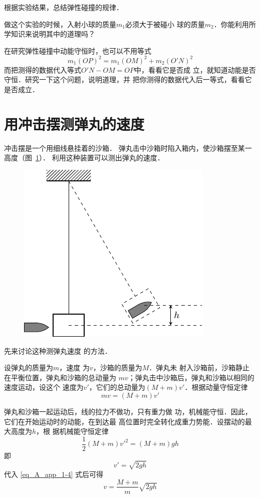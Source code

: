 根据实验结果，总结弹性碰撞的规律．

做这个实验的时候，入射小球的质量$m_1$必须大于被碰小
球的质量$m_2$．你能利用所学知识来说明其中的道理吗？

在研究弹性碰撞中动能守恒时，也可以不用等式
\[m_1(OP)^2=m_1(OM)^2+m_2(O'N)^2\]
而把测得的数据代入等式$O'N-OM=OP$中，看看它是否成
立，就知道动能是否守恒．研究一下这个问题，说明道理，并
把你测得的数据代入后一等式，看看它是否成立．


\section{用冲击摆测弹丸的速度}
冲击摆是一个用细线悬挂着的沙箱．
弹丸击中沙箱时陷入箱内，使沙箱摆至某一高度（图~\ref{fig_A_10-20}）．
利用这种装置可以测出弹丸的速度．
\begin{figure}[htbp]
    \centering
    \includegraphics{fig/A/10-20.pdf}
    \caption{}\label{fig_A_10-20}
\end{figure}

先来讨论这种测弹丸速度
的方法．

设弹丸的质量为$m$，速度
为$v$，沙箱的质量为$M$．弹丸未
射入沙箱前，沙箱静止在平衡位置，弹丸和沙箱的总动量为
$mv$；弹丸击中沙箱后，弹丸和沙箱以相同的速度运动，设这个
速度为$v'$，它们的总动量为$(M+m)v'$．根据动量守恒定律
\begin{equation}\label{eq_A_app_1-4}
    mv=(M+m)v'
\end{equation}

弹丸和沙箱一起运动后，线的拉力不做功，只有重力做
功，机械能守恒．因此，它们在开始运动时的动能，在到达最
高位置时完全转化成重力势能．设摆动的最大高度为$h$，根
据机械能守恒定律
\begin{equation}\label{eq_A_app_1-5}
    \frac{1}{2}(M+m){v'}^2 =(M+m)gh
\end{equation}
即
\[v'=\sqrt{2gh}\]
代入 \eqref{eq_A_app_1-4} 式后可得
\begin{equation}\label{eq_A_app_1-6}
v=\frac{M+m}{m}\sqrt{2gh}
\end{equation}



